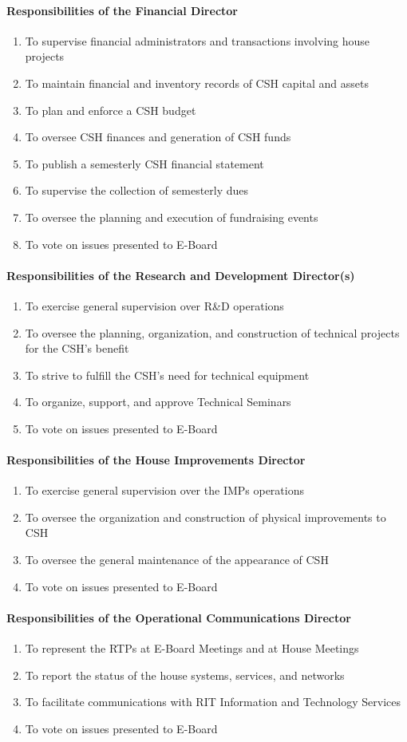 \documentclass{article}
\newcommand{\asubsubsection}[1]{\paragraph{#1} \label{#1}}
\begin{document}
\asubsubsection{Responsibilities of the Financial Director}
\begin{enumerate}
	\item To supervise financial administrators and transactions involving house projects
	\item To maintain financial and inventory records of CSH capital and assets
	\item To plan and enforce a CSH budget
	\item To oversee CSH finances and generation of CSH funds
	\item To publish a semesterly CSH financial statement
	\item To supervise the collection of semesterly dues
	\item To oversee the planning and execution of fundraising events
	\item To vote on issues presented to E-Board
\end{enumerate}

\asubsubsection{Responsibilities of the Research and Development Director(s)}
\begin{enumerate}
	\item To exercise general supervision over R\&D operations
	\item To oversee the planning, organization, and construction of technical projects for the CSH's benefit
	\item To strive to fulfill the CSH's need for technical equipment
	\item To organize, support, and approve Technical Seminars
	\item To vote on issues presented to E-Board
\end{enumerate}

\asubsubsection{Responsibilities of the House Improvements Director}
\begin{enumerate}
	\item To exercise general supervision over the IMPs operations
	\item To oversee the organization and construction of physical improvements to CSH
	\item To oversee the general maintenance of the appearance of CSH
	\item To vote on issues presented to E-Board
\end{enumerate}

\asubsubsection{Responsibilities of the Operational Communications Director}
\begin{enumerate}
	\item To represent the RTPs at E-Board Meetings and at House Meetings
	\item To report the status of the house systems, services, and networks
	\item To facilitate communications with RIT Information and Technology Services
	\item To vote on issues presented to E-Board
\end{enumerate}
\end{document}
